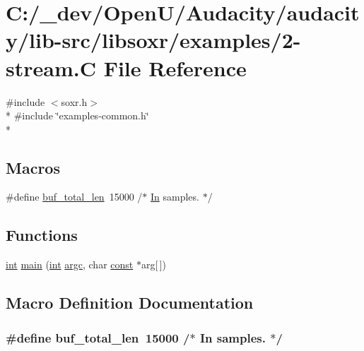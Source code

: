 \hypertarget{2-stream_8_c}{}\section{C\+:/\+\_\+dev/\+Open\+U/\+Audacity/audacity/lib-\/src/libsoxr/examples/2-\/stream.C File Reference}
\label{2-stream_8_c}
{\ttfamily \#include $<$soxr.\+h$>$}\\*
{\ttfamily \#include \char`\"{}examples-\/common.\+h\char`\"{}}\\*
\subsection*{Macros}
\begin{DoxyCompactItemize}
\item 
\#define \hyperlink{2-stream_8_c_a58c391d4fe581fb9e15cf5c89099f1d7}{buf\+\_\+total\+\_\+len}~15000  /$\ast$ \hyperlink{devicetopology_8h_aab6c7474a070d22bf61ccf21b532412fad8ff8dfc9381018e97fce86d909f8975}{In} samples. $\ast$/
\end{DoxyCompactItemize}
\subsection*{Functions}
\begin{DoxyCompactItemize}
\item 
\hyperlink{xmltok_8h_a5a0d4a5641ce434f1d23533f2b2e6653}{int} \hyperlink{2-stream_8_c_afe6cf7ee8dc50d0bc3da26fd0a7c7d67}{main} (\hyperlink{xmltok_8h_a5a0d4a5641ce434f1d23533f2b2e6653}{int} \hyperlink{cmdline_8c_aaffeb1bf2056ea44af5b5d0ee4d6ff07}{argc}, char \hyperlink{getopt1_8c_a2c212835823e3c54a8ab6d95c652660e}{const} $\ast$arg\mbox{[}$\,$\mbox{]})
\end{DoxyCompactItemize}


\subsection{Macro Definition Documentation}
\subsubsection[{\texorpdfstring{buf\+\_\+total\+\_\+len}{buf_total_len}}]{\setlength{\rightskip}{0pt plus 5cm}\#define buf\+\_\+total\+\_\+len~15000  /$\ast$ {\bf In} samples. $\ast$/}\hypertarget{2-stream_8_c_a58c391d4fe581fb9e15cf5c89099f1d7}{}\label{2-stream_8_c_a58c391d4fe581fb9e15cf5c89099f1d7}


